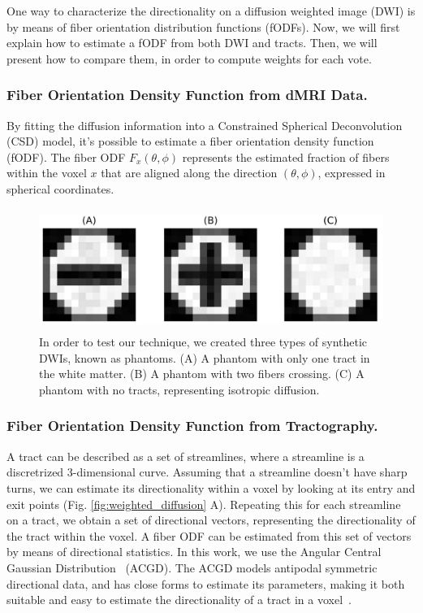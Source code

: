 One way to characterize the directionality on a diffusion weighted image (DWI) is
by means of fiber orientation distribution functions (fODFs). Now, we will first
explain how to estimate a fODF from both DWI and tracts. Then, we will present
how to compare them, in order to compute weights for each vote.

\subsubsection{Fiber Orientation Density Function from dMRI Data.}
By fitting the diffusion information into a Constrained Spherical Deconvolution (CSD)
model, it's possible to estimate a fiber orientation density function\cite{Tournier2004} (fODF). 
The fiber ODF $F_x(\theta, \phi)$ represents the estimated fraction of fibers
within the voxel $x$ that are aligned along the direction $(\theta, \phi)$,
expressed in spherical coordinates.

\begin{figure}[t!]
    \includegraphics[height=150px]{7.multiatlas/img/phantoms.png}
    \caption{In order to test our technique, we created three types of synthetic DWIs, known as phantoms.
             (A) A phantom with only one tract in the white matter. (B) A phantom with two fibers crossing.
             (C) A phantom with no tracts, representing isotropic diffusion.}
    \label{fig:pha_exp_1}
\end{figure}

\subsubsection{Fiber Orientation Density Function from Tractography.}
A tract can be described as a set of streamlines, where a streamline is a
discretrized 3-dimensional curve. Assuming that a streamline doesn't have sharp
turns, we can estimate its directionality within a voxel by looking at its
entry and exit points (Fig. \ref{fig:weighted_diffusion} A). Repeating this for each streamline
on a tract, we obtain a set of directional vectors, representing the directionality
of the tract within the voxel. A fiber ODF can be estimated from this set of
vectors by means of directional statistics. In this work, we use the
Angular Central Gaussian Distribution~\cite{Mardia1999} (ACGD). The ACGD models
antipodal symmetric directional data, and has close forms to estimate its
parameters, making it both suitable and easy to estimate the directionality of
a tract in a voxel~\cite{Mardia1999}.

